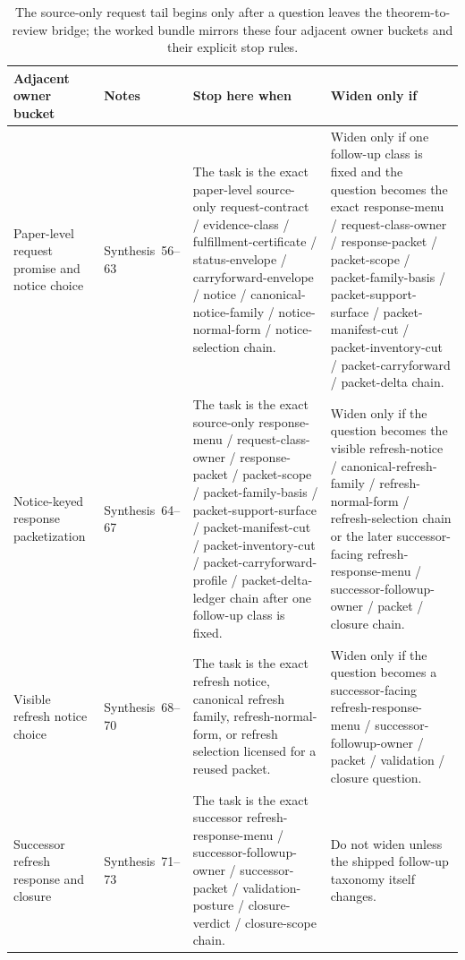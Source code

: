 \documentclass[11pt]{article}
\begin{document}
\begin{table}[t]
\centering
\small
\begin{tabularx}{\linewidth}{@{}L M Y Y@{}}
\toprule
Adjacent owner bucket & Notes & Stop here when & Widen only if \\
\midrule
Paper-level request promise and notice choice & Synthesis~56--63 & The task is the exact paper-level source-only request-contract / evidence-class / fulfillment-certificate / status-envelope / carryforward-envelope / notice / canonical-notice-family / notice-normal-form / notice-selection chain. & Widen only if one follow-up class is fixed and the question becomes the exact response-menu / request-class-owner / response-packet / packet-scope / packet-family-basis / packet-support-surface / packet-manifest-cut / packet-inventory-cut / packet-carryforward / packet-delta chain. \\
Notice-keyed response packetization & Synthesis~64--67 & The task is the exact source-only response-menu / request-class-owner / response-packet / packet-scope / packet-family-basis / packet-support-surface / packet-manifest-cut / packet-inventory-cut / packet-carryforward-profile / packet-delta-ledger chain after one follow-up class is fixed. & Widen only if the question becomes the visible refresh-notice / canonical-refresh-family / refresh-normal-form / refresh-selection chain or the later successor-facing refresh-response-menu / successor-followup-owner / packet / closure chain. \\
Visible refresh notice choice & Synthesis~68--70 & The task is the exact refresh notice, canonical refresh family, refresh-normal-form, or refresh selection licensed for a reused packet. & Widen only if the question becomes a successor-facing refresh-response-menu / successor-followup-owner / packet / validation / closure question. \\
Successor refresh response and closure & Synthesis~71--73 & The task is the exact successor refresh-response-menu / successor-followup-owner / successor-packet / validation-posture / closure-verdict / closure-scope chain. & Do not widen unless the shipped follow-up taxonomy itself changes. \\
\bottomrule
\end{tabularx}
\caption{The source-only request tail begins only after a question leaves the theorem-to-review bridge; the worked bundle mirrors these four adjacent owner buckets and their explicit stop rules.}
\label{tab:seriesadjacentbuckets}
\end{table}
\end{document}
